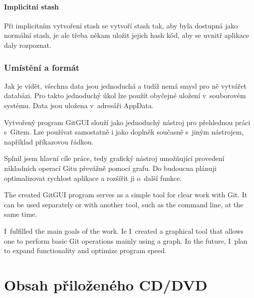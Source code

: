 \documentclass[
  biblatex,
  glossaries,
  index
]{kidiplom}
\begin{document}
\paragraph*{Implicitní stash}
Při implicitním vytvoření stash se vytvoří stash tak, aby byla dostupná jako normální stash, je ale třeba někam uložit jejich hash kód, aby se uvnitř aplikace daly rozpoznat.

\subsubsection{Umístění a formát}
Jak je vidět, všechna data jsou jednoduchá a tudíž nemá smysl pro ně vytvářet databázi. Pro takto jednoduchý úkol lze použít obyčejné uložení v~souborovém systému. Data jsou uložena v~adresáři AppData.

\begin{kiconclusions}
Vytvořený program GitGUI slouží jako jednoduchý nástroj pro přehlednou práci s~Gitem. Lze používat samostatně i jako doplněk současně s~jiným nástrojem, například příkazovou řádkou.

Splnil jsem hlavní cíle práce, tedy grafický nástroj umožňující provedení základních operací Gitu převážně pomocí grafu. Do budoucna plánuji optimalizovat rychlost aplikace a rozšířit ji o~další funkce.
\end{kiconclusions}

\begin{kiconclusions}[english]
The created GitGUI program serves as a simple tool for clear work with Git. It can be used separately or with another tool, such as the command line, at the same time.

I~fulfilled the main goals of the work. Ie I~created a graphical tool that allows one to perform basic Git operations mainly using a graph. In the future, I~plan to expand functionality and optimize program speed.

\end{kiconclusions}

\appendix

\section{Obsah přiloženého CD/DVD} \label{sec:ObsahCD}
\end{document}
